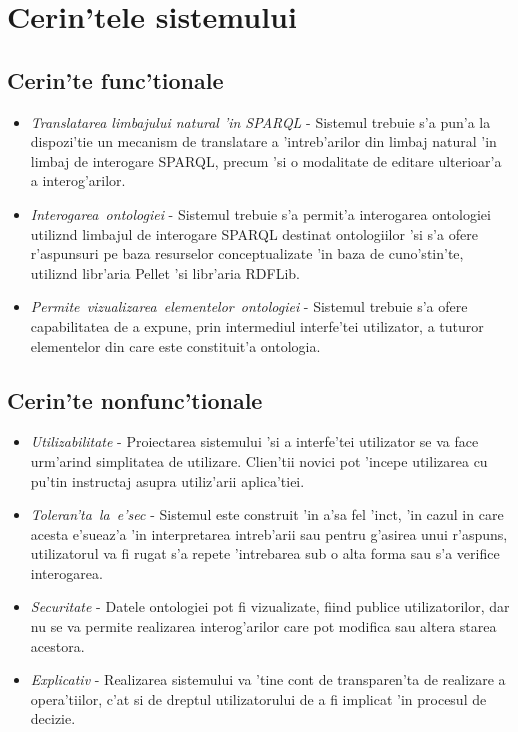\documentclass[12pt,a4paper,twoside]{report}
\begin{document}
\section{Cerin'tele sistemului}

\subsection{Cerin'te func'tionale}

\begin{itemize}
    \item {\it Translatarea limbajului natural 'in SPARQL} - Sistemul trebuie s'a pun'a la dispozi'tie un mecanism de translatare a 'intreb'arilor din limbaj natural 'in limbaj de interogare SPARQL, precum 'si o modalitate de editare ulterioar'a a interog'arilor.
    \item {\it Interogarea\ ontologiei} -  Sistemul trebuie s'a permit'a interogarea ontologiei utiliz\ia nd limbajul de interogare SPARQL destinat ontologiilor 'si s'a ofere r'aspunsuri pe baza resurselor conceptualizate 'in baza de cuno'stin'te, utiliz\ia nd libr'aria Pellet 'si libr'aria RDFLib.
    \item {\it Permite\ vizualizarea\ elementelor\ ontologiei} - Sistemul trebuie s'a ofere capabilitatea de a expune, prin intermediul interfe'tei utilizator, a tuturor elementelor din care este constituit'a ontologia.
\end{itemize}
\subsection{Cerin'te nonfunc'tionale}
\begin{itemize}
    \item {\it Utilizabilitate} - Proiectarea sistemului 'si a interfe'tei utilizator se va face urm'arind simplitatea de utilizare. Clien'tii novici pot 'incepe utilizarea cu pu'tin instructaj asupra utiliz'arii aplica'tiei.
    \item {\it Toleran'ta\ la\ e'sec} - Sistemul este construit 'in a'sa fel 'inc\ia t, 'in cazul in care acesta e'sueaz'a 'in interpretarea intreb'arii sau pentru g'asirea unui r'aspuns, utilizatorul va fi rugat s'a repete 'intrebarea sub o alta forma sau s'a verifice interogarea.
    \item {\it Securitate} - Datele ontologiei pot fi vizualizate, fiind publice utilizatorilor, dar nu se va permite realizarea interog'arilor care pot modifica  sau altera starea acestora.
    \item {\it Explicativ} - Realizarea sistemului va 'tine cont de transparen'ta de realizare a opera'tiilor, c'at si de dreptul utilizatorului de a fi implicat 'in procesul de decizie.
\end{itemize}
\end{document}
